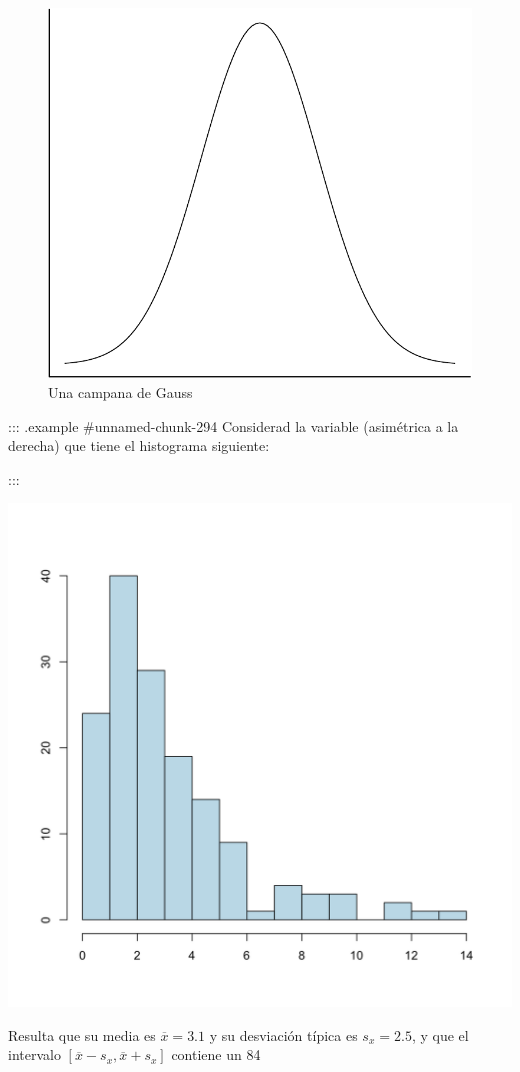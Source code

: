 \documentclass[
]{book}
\theoremstyle{definition}
\theoremstyle{definition}
\theoremstyle{definition}
\theoremstyle{definition}
\theoremstyle{remark}
\begin{document}
\begin{figure}

{\centering \includegraphics[width=0.6\linewidth]{INREMDN_files/figure-latex/Gauss-1} 

}

\caption{Una campana de Gauss}\label{fig:Gauss}
\end{figure}



::: {.example #unnamed-chunk-294}
Considerad la variable (asimétrica a la derecha) que tiene el histograma siguiente:
  
:::


\begin{center}\includegraphics[width=0.6\linewidth]{INREMDN_files/figure-html/asim} \end{center}

Resulta que su media es $\overline{x}=3.1$ y su desviación típica es $s_x=2.5$, y que el intervalo $[\overline{x}-s_x,\overline{x}+s_x]$ contiene un 84%
\end{document}
